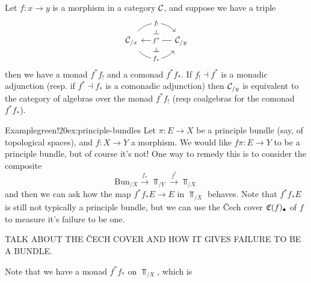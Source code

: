 Let $f : x \to y$ is a morphism in a category $\mathcal{C}$, and suppose we have a triple 
    \[
    \begin{tikzcd}[sep = large,labels=description]
    \Ca_{/x}
        \arrow[r, "f_!"{name=F}, bend left = 49, shift left]
        \arrow[r, "f_\ast"{name=H}, bend right = 49, shift right]
    & \Ca_{/y}
        \arrow[l, "f^\ast"{name=G}]
    \arrow[phantom, from=F, to=G, "\dashv" rotate=-90]
    \arrow[phantom, from=G, to=H, "\dashv" rotate=-90]
    \end{tikzcd}
    \]
then we have a monad $f^\ast f_!$ and a comonad $f^\ast f_\ast$. If $f_! \dashv f^\ast$ is a monadic adjunction (resp. if $f^\ast \dashv f_\ast$ is a comonadic adjunction) then $\mathcal{C}_{/y}$ is equivalent to the category of algebras over the monad $f^\ast f_!$ (resp coalgebras for the comonad $f^\ast f_\ast$). 

\begin{env}{Example}{green!20}{ex:principle-bundles}
    Let $\pi : E \to X$ be a principle bundle (say, of topological spaces), and $f : X \to Y$ a morphism. We would like $f\pi : E \to Y$ to be a principle bundle, but of course it's not! One way to remedy this is to consider the composite
        \[
        \text{Bun}_{/X}
        \xrightarrow{f_\ast} \Top_{/Y}
        \xrightarrow{f^\ast} \Top_{/X} 
        \]
    and then we can ask how the map $f^\ast f_\ast E \to E$ in $\Top_{/X}$ behaves. Note that $f^\ast f_\ast E$ is still not typically a principle bundle, but we can use the \v{C}ech cover $\mathfrak{C}(f)_\bullet$ of $f$ to measure it's failure to be one. 

    {\color{red}TALK ABOUT THE \v{C}ECH COVER AND HOW IT GIVES FAILURE TO BE A BUNDLE.}

    Note that we have a monad $f^\ast f_\ast$ on $\Top_{/X}$, which is 
\end{env}

